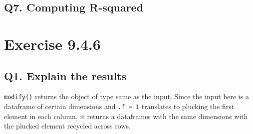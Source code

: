 \documentclass[
]{book}
\newenvironment{Shaded}{\begin{snugshade}}{\end{snugshade}}
\newcommand{\AttributeTok}[1]{\textcolor[rgb]{0.77,0.63,0.00}{#1}}
\newcommand{\CommentTok}[1]{\textcolor[rgb]{0.56,0.35,0.01}{\textit{#1}}}
\newcommand{\ConstantTok}[1]{\textcolor[rgb]{0.00,0.00,0.00}{#1}}
\newcommand{\ControlFlowTok}[1]{\textcolor[rgb]{0.13,0.29,0.53}{\textbf{#1}}}
\newcommand{\DecValTok}[1]{\textcolor[rgb]{0.00,0.00,0.81}{#1}}
\newcommand{\FunctionTok}[1]{\textcolor[rgb]{0.00,0.00,0.00}{#1}}
\newcommand{\NormalTok}[1]{#1}
\newcommand{\OtherTok}[1]{\textcolor[rgb]{0.56,0.35,0.01}{#1}}
\newcommand{\SpecialCharTok}[1]{\textcolor[rgb]{0.00,0.00,0.00}{#1}}
\begin{document}
\hypertarget{q7.-computing-r-squared}{%
\subsection*{Q7. Computing R-squared}\label{q7.-computing-r-squared}}

\begin{Shaded}
\end{Shaded}

\hypertarget{exercise-9.4.6}{%
\section{Exercise 9.4.6}\label{exercise-9.4.6}}

\hypertarget{q1.-explain-the-results}{%
\subsection*{Q1. Explain the results}\label{q1.-explain-the-results}}

\texttt{modify()} returns the object of type same as the input. Since the input here is a dataframe of certain dimensions and \texttt{.f\ =\ 1} translates to plucking the first element in each column, it returns a dataframes with the same dimensions with the plucked element recycled across rows.
\end{document}
